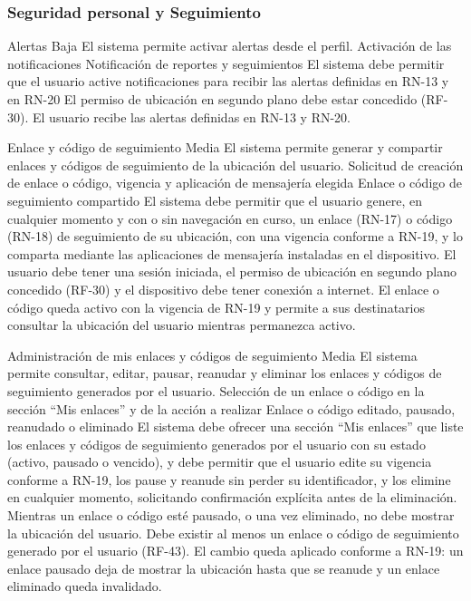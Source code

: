 \subsubsection{Seguridad personal y Seguimiento}

  {Alertas}%
  {Baja}%
  {El sistema permite activar alertas desde el perfil.}%
  {Activación de las notificaciones}%
  {Notificación de reportes y seguimientos}%
  {El sistema debe permitir que el usuario active notificaciones para recibir las alertas definidas en RN-13 y en RN-20 }%
  {El permiso de ubicación en segundo plano debe estar concedido (RF-30).}%
  {El usuario recibe las alertas definidas en RN-13 y RN-20.}%

  {Enlace y código de seguimiento}%
  {Media}%
  {El sistema permite generar y compartir enlaces y códigos de seguimiento de la ubicación del usuario.}%
  {Solicitud de creación de enlace o código, vigencia y aplicación de mensajería elegida}%
  {Enlace o código de seguimiento compartido}%
  {El sistema debe permitir que el usuario genere, en cualquier momento y con o sin navegación en curso, un enlace (RN-17) o código (RN-18) de seguimiento de su ubicación, con una vigencia conforme a RN-19, y lo comparta mediante las aplicaciones de mensajería instaladas en el dispositivo.}%
  {El usuario debe tener una sesión iniciada, el permiso de ubicación en segundo plano concedido (RF-30) y el dispositivo debe tener conexión a internet.}%
  {El enlace o código queda activo con la vigencia de RN-19 y permite a sus destinatarios consultar la ubicación del usuario mientras permanezca activo.}%
  
  {Administración de mis enlaces y códigos de seguimiento}%
  {Media}%
  {El sistema permite consultar, editar, pausar, reanudar y eliminar los enlaces y códigos de seguimiento generados por el usuario.}%
  {Selección de un enlace o código en la sección \enquote{Mis enlaces} y de la acción a realizar}%
  {Enlace o código editado, pausado, reanudado o eliminado}%
  {El sistema debe ofrecer una sección \enquote{Mis enlaces} que liste los enlaces y códigos de seguimiento generados por el usuario con su estado (activo, pausado o vencido), y debe permitir que el usuario edite su vigencia conforme a RN-19, los pause y reanude sin perder su identificador, y los elimine en cualquier momento, solicitando confirmación explícita antes de la eliminación. Mientras un enlace o código esté pausado, o una vez eliminado, no debe mostrar la ubicación del usuario.}%
  {Debe existir al menos un enlace o código de seguimiento generado por el usuario (RF-43).}%
  {El cambio queda aplicado conforme a RN-19: un enlace pausado deja de mostrar la ubicación hasta que se reanude y un enlace eliminado queda invalidado.}%

